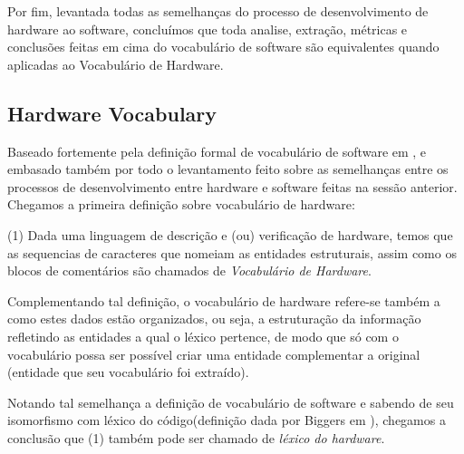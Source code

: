 \documentclass[12pt, twocolumn, a4paper]{article}
\begin{document}
Por fim, levantada todas as semelhanças do processo de desenvolvimento de hardware ao software, concluímos que toda analise, extração, métricas e conclusões feitas em cima do vocabulário de software são equivalentes quando aplicadas ao Vocabulário de Hardware.

	\subsection{Hardware Vocabulary} 
	
\quad Baseado fortemente pela definição formal de vocabulário de software em  \cite{Santos2015}, e embasado também por todo o levantamento feito sobre as semelhanças entre os processos de desenvolvimento entre hardware e software feitas na sessão anterior. Chegamos a primeira definição sobre vocabulário de hardware:
	
(1) Dada uma linguagem de descrição e (ou) verificação de hardware, temos que as sequencias de caracteres que nomeiam as entidades estruturais, assim como os blocos de comentários são chamados de \textit{Vocabulário de Hardware}.

Complementando tal definição, o vocabulário de hardware refere-se também a como estes dados estão organizados, ou seja, a estruturação da informação refletindo as entidades a qual o léxico pertence, de modo que só com o vocabulário possa ser possível criar uma entidade complementar a original (entidade que seu vocabulário foi extraído).

Notando tal semelhança a definição de vocabulário de software e sabendo de seu isomorfismo com léxico do código(definição dada por Biggers em \cite{Biggers2011}), chegamos a conclusão que (1) também pode ser chamado de \textit{léxico do hardware}.
\end{document}
